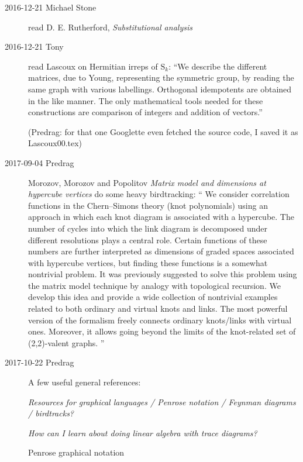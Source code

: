 \begin{description}
\item[2016-12-21 Michael Stone] read
D. E. Rutherford, {\em Substitutional analysis}

\item[2016-12-21 Tony] read Lascoux on Hermitian irreps of
$\textrm{S}_k$: ``We describe the different matrices, due to Young, representing
the symmetric group, by reading the same graph with various labellings.
Orthogonal idempotents are obtained in the like manner. The only
mathematical tools needed for these constructions are comparison of
integers and addition of vectors.''

(Predrag: for that one Googlette even fetched the source code, I saved it as
Lascoux00.tex)

\item[2017-09-04 Predrag]
Morozov, Morozov  and Popolitov
{\em Matrix model and dimensions at hypercube vertices}
do some heavy birdtracking: ``
We consider correlation functions in the Chern--Simons theory (knot
polynomials) using an approach in which each knot diagram is associated with
a hypercube. The number of cycles into which the link diagram is decomposed
under different resolutions plays a central role. Certain functions of these
numbers are further interpreted as dimensions of graded spaces associated
with hypercube vertices, but finding these functions is a somewhat nontrivial
problem. It was previously suggested to solve this problem using the matrix
model technique by analogy with topological recursion. We develop this idea
and provide a wide collection of nontrivial examples related to both ordinary
and virtual knots and links. The most powerful version of the formalism
freely connects ordinary knots/links with virtual ones. Moreover, it allows
going beyond the limits of the knot-related set of (2,2)-valent graphs.
''

\item[2017-10-22 Predrag]
A few useful general references:

{\em Resources for graphical languages / Penrose notation / Feynman diagrams /
{birdtracks?}
}

{\em How can I learn about doing linear algebra with
{trace diagrams?}
}

{Penrose graphical notation}


\end{description}
